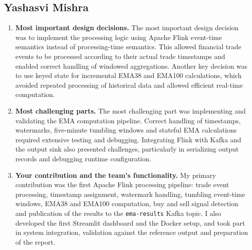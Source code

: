 \documentclass[sigconf]{acmart}
\begin{document}
\subsection{\texorpdfstring{{Yashasvi Mishra}}{Yashasvi Mishra}}
\begin{enumerate}
  \item \textbf{Most important design decisions.} The most important design decision was to implement the processing logic using Apache Flink event-time semantics instead of processing-time semantics. This allowed financial trade events to be processed according to their actual trade timestamps and enabled correct handling of windowed aggregations. Another key decision was to use keyed state for incremental EMA38 and EMA100 calculations, which avoided repeated processing of historical data and allowed efficient real-time computation.
  \item \textbf{Most challenging parts.} The most challenging part was implementing and validating the EMA computation pipeline. Correct handling of timestamps, watermarks, five-minute tumbling windows and stateful EMA calculations required extensive testing and debugging. Integrating Flink with Kafka and the output sink also presented challenges, particularly in serializing output records and debugging runtime configuration.
  \item \textbf{Your contribution and the team's functionality.} My primary contribution was the first Apache Flink processing pipeline: trade event processing, timestamp assignment, watermark handling, tumbling event-time windows, EMA38 and EMA100 computation, buy and sell signal detection and publication of the results to the \texttt{ema-results} Kafka topic. I also developed the first Streamlit dashboard and the Docker setup, and took part in system integration, validation against the reference output and preparation of the report.
\end{enumerate}
\end{document}
